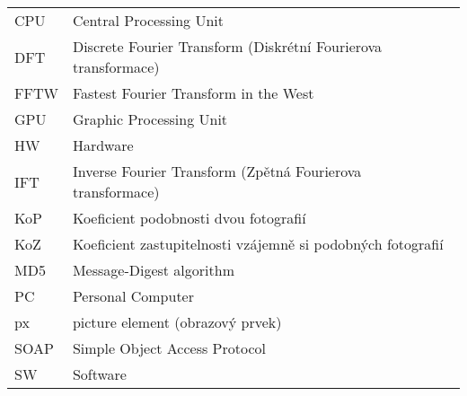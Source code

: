 
\seznamzkr

\begin{tabular}{ll}
  CPU	& Central Processing Unit											\\
  DFT	& Discrete Fourier Transform (Diskrétní Fourierova transformace)	\\
  FFTW	& Fastest Fourier Transform in the West 							\\
  GPU	& Graphic Processing Unit											\\
  HW	& Hardware															\\
  IFT	& Inverse Fourier Transform (Zpětná Fourierova transformace)		\\
  KoP	& Koeficient podobnosti dvou fotografií								\\
  KoZ	& Koeficient zastupitelnosti vzájemně si podobných fotografií		\\
  MD5	& Message-Digest algorithm											\\
  PC	& Personal Computer													\\
  px	& picture element (obrazový prvek)									\\
  SOAP	& Simple Object Access Protocol										\\
  SW	& Software															\\
\end{tabular}

